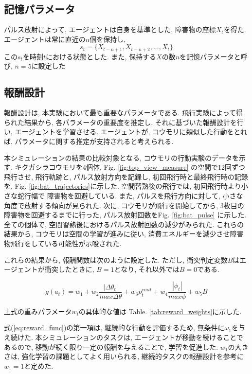 \documentclass[../main]{subfiles}
\begin{document}
\subsection{記憶パラメータ}
パルス放射によって, エージェントは自身を基準とした, 
障害物の座標$X_t$を得た. 
エージェントは常に直近の$n$個を保持し, 
$$
s_t = \{X_{t-n+1}, X_{t-n+2}, ..., X_t\}
$$
この$s_t$を時刻$t$における状態とした.
また, 保持する$X$の数$n$を記憶パラメータと呼び, 
$n=5$に設定した

\subsection{報酬設計}
報酬設計は, 本実験において最も重要なパラメータである.
飛行実験によって得られた結果から, 各パラメータの重要度を推定し, 
それに基づいた報酬設計を行い, エージェントを学習させる. 
エージェントが, コウモリに類似した行動をとれば, 
パラメータに関する推定が支持されると考えられる.

本シミュレーションの結果の比較対象となる, 
コウモリの行動実験のデータを示す.
キクガシラコウモリを4個体, Fig. \ref{fig:top_view_measure}
の空間で12回ずつ飛行させ, 
飛行軌跡と, パルス放射方向を記録し, 
初回飛行時と最終飛行時の記録を, 
Fig. \ref{fig:bat_trajectories}に示した.
空間習熟後の飛行では, 初回飛行時より小さな蛇行幅で
障害物を回避している. 
また, パルスを飛行方向に対して, 
小さな角度で放射する傾向が見られた.
次に, コウモリが飛行を開始してから, 
3枚目の障害物を回避するまでに行った, 
パルス放射回数をFig. \ref{fig:bat_pulse}
に示した.
全ての個体で, 空間習熟後におけるパルス放射回数の減少がみられた.
これらの結果から, コウモリは空間の学習が進みに従い, 
消費エネルギーを減少させ障害物飛行をしている可能性が示唆された.

これらの結果から, 報酬関数は次のように設定した. 
ただし, 衝突判定変数$B$はエージェントが衝突したときに, $B=1$となり, 
それ以外では$B=0$である.

\begin{equation}
\label{eq:reward_func}
 g(a_t) = 
w_1 +
w_2 \frac{|\Delta\theta_t|}{max \Delta\theta} +
w_3 p^{emit}_t +
w_4 \frac{|\phi_t|}{max \phi} +
w_5 B
\end{equation}

上式の重みパラメータ$w_i$の具体的な値は
Table. \ref{tab:reward_weights}に示した.

式(\ref{eq:reward_func})の第一項は, 
継続的な行動を評価するため, 無条件に$\omega_1$を与え続けた.
本シミュレーションのタスクは, 
エージェントが移動を続けることであるので, 
移動が続く限り一定の報酬を与えることで, 学習を促進した.
$w_1$の大きさは, 強化学習の課題としてよく用いられる, 
継続的タスクの報酬設計を参考に$w_1=1$と定めた.
\end{document}
